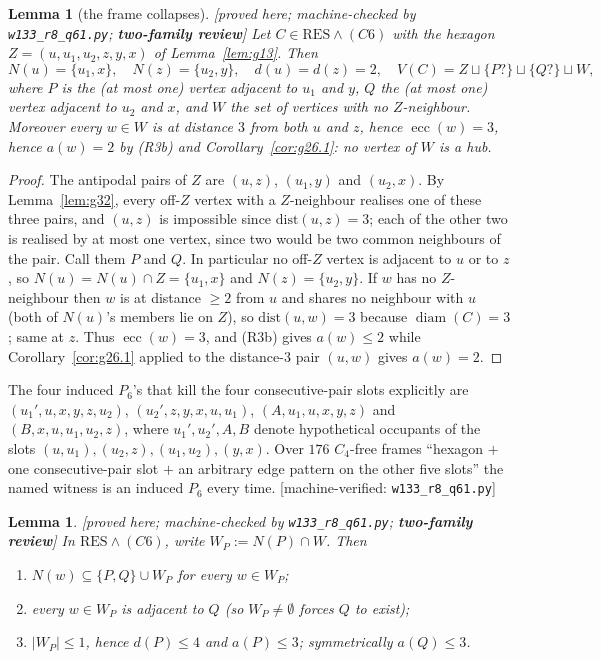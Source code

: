 \documentclass[11pt]{article}
\theoremstyle{plain}
\newtheorem{lemma}[theorem]{Lemma}
\theoremstyle{definition}
\theoremstyle{remark}
\numberwithin{equation}{section}
\newcommand{\ecc}{\operatorname{ecc}}
\newcommand{\diam}{\operatorname{diam}}
\newcommand{\statusbox}[1]{{\small\sloppy\textsf{[#1]}}}
\newcommand{\REV}[1]{\statusbox{proved here; machine-checked by \texttt{#1};
\textbf{two-family review}}}
\newcommand{\MV}[1]{\statusbox{machine-verified: \texttt{#1}}}
\begin{document}
\begin{lemma}[the frame collapses]\label{lem:g33}
\REV{w133\_r8\_q61.py}
Let $C \in \mathrm{RES}\wedge(C6)$ with the hexagon $Z = (u,u_1,u_2,z,y,x)$ of
Lemma~\ref{lem:g13}. Then
\[
 N(u) = \{u_1, x\},\quad N(z) = \{u_2,y\},\quad d(u)=d(z)=2,\quad
 V(C) = Z \sqcup \{P?\} \sqcup \{Q?\} \sqcup W,
\]
where $P$ is the (at most one) vertex adjacent to $u_1$ and $y$, $Q$ the (at most one) vertex
adjacent to $u_2$ and $x$, and $W$ the set of vertices with no $Z$-neighbour. Moreover every
$w \in W$ is at distance $3$ from both $u$ and $z$, hence $\ecc(w) = 3$, hence $a(w) = 2$ by
(R3b) and Corollary~\ref{cor:g26.1}: no vertex of $W$ is a hub.
\end{lemma}

\begin{proof}
The antipodal pairs of $Z$ are $(u,z)$, $(u_1,y)$ and $(u_2,x)$. By Lemma~\ref{lem:g32},
every off-$Z$ vertex with a $Z$-neighbour realises one of these three pairs, and $(u,z)$ is
impossible since $\mathrm{dist}(u,z) = 3$; each of the other two is realised by at most one
vertex, since two would be two common neighbours of the pair. Call them $P$ and $Q$. In
particular no off-$Z$ vertex is adjacent to $u$ or to $z$, so $N(u) = N(u)\cap Z = \{u_1,x\}$
and $N(z) = \{u_2,y\}$. If $w$ has no $Z$-neighbour then $w$ is at distance $\ge 2$ from $u$
and shares no neighbour with $u$ (both of $N(u)$'s members lie on $Z$), so
$\mathrm{dist}(u,w) = 3$ because $\diam(C) = 3$; same at $z$. Thus $\ecc(w) = 3$, and (R3b)
gives $a(w)\le 2$ while Corollary~\ref{cor:g26.1} applied to the distance-$3$ pair $(u,w)$
gives $a(w) = 2$.
\end{proof}

The four induced $P_6$'s that kill the four consecutive-pair slots explicitly are
$(u_1', u, x, y, z, u_2)$, $(u_2', z, y, x, u, u_1)$, $(A, u_1, u, x, y, z)$ and
$(B, x, u, u_1, u_2, z)$, where $u_1', u_2', A, B$ denote hypothetical occupants of the slots
$(u,u_1), (u_2,z), (u_1,u_2), (y,x)$. Over $176$ $C_4$-free frames ``hexagon $+$ one
consecutive-pair slot $+$ an arbitrary edge pattern on the other five slots'' the named
witness is an induced $P_6$ every time. \MV{w133\_r8\_q61.py}

\begin{lemma}\label{lem:g34}
\REV{w133\_r8\_q61.py}
In $\mathrm{RES}\wedge(C6)$, write $W_P := N(P)\cap W$. Then
\begin{enumerate}
\item[(a)] $N(w) \subseteq \{P,Q\}\cup W_P$ for every $w \in W_P$;
\item[(b)] every $w \in W_P$ is adjacent to $Q$ (so $W_P \ne \emptyset$ forces $Q$ to exist);
\item[(c)] $|W_P|\le 1$, hence $d(P) \le 4$ and $a(P)\le 3$; symmetrically $a(Q)\le 3$.
\end{enumerate}
\end{lemma}
\end{document}
